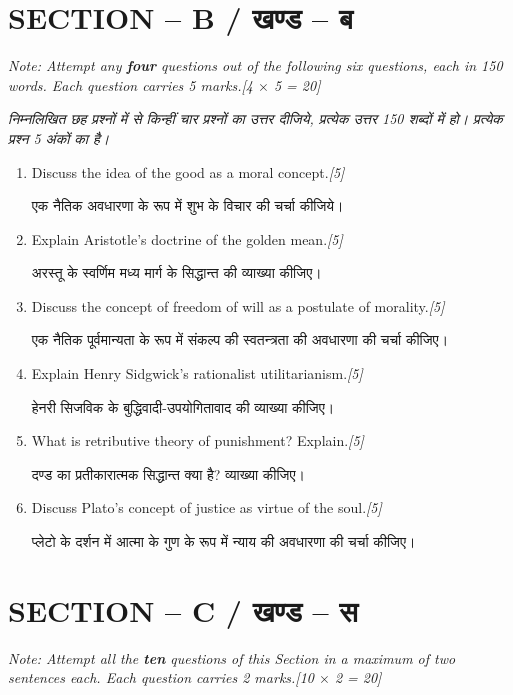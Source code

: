 \documentclass[11pt,a4paper]{article}
\newcommand{\pts}[1]{\hfill \textit{[#1]}}
\begin{document}
\bigskip

\section*{SECTION -- B / खण्ड -- ब}
\noindent \textit{Note: Attempt any \textbf{four} questions out of the following six questions, each in 150 words. Each question carries 5 marks.}\pts{4 $\times$ 5 = 20}

\noindent \textit{निम्नलिखित छह प्रश्नों में से किन्हीं चार प्रश्नों का उत्तर दीजिये, प्रत्येक उत्तर 150 शब्दों में हो। प्रत्येक प्रश्न 5 अंकों का है।}

\begin{enumerate}[label=\textbf{\arabic*.},leftmargin=*,start=6,itemsep=10pt]

  \item Discuss the idea of the good as a moral concept.\pts{5}
  
  एक नैतिक अवधारणा के रूप में शुभ के विचार की चर्चा कीजिये।

  \item Explain Aristotle's doctrine of the golden mean.\pts{5}
  
  अरस्तू के स्वर्णिम मध्य मार्ग के सिद्धान्त की व्याख्या कीजिए।

  \item Discuss the concept of freedom of will as a postulate of morality.\pts{5}
  
  एक नैतिक पूर्वमान्यता के रूप में संकल्प की स्वतन्त्रता की अवधारणा की चर्चा कीजिए।

  \item Explain Henry Sidgwick's rationalist utilitarianism.\pts{5}
  
  हेनरी सिजविक के बुद्धिवादी-उपयोगितावाद की व्याख्या कीजिए।

  \item What is retributive theory of punishment? Explain.\pts{5}
  
  दण्ड का प्रतीकारात्मक सिद्धान्त क्या है? व्याख्या कीजिए।

  \item Discuss Plato's concept of justice as virtue of the soul.\pts{5}
  
  प्लेटो के दर्शन में आत्मा के गुण के रूप में न्याय की अवधारणा की चर्चा कीजिए।

\end{enumerate}

\bigskip

\section*{SECTION -- C / खण्ड -- स}
\noindent \textit{Note: Attempt all the \textbf{ten} questions of this Section in a maximum of two sentences each. Each question carries 2 marks.}\pts{10 $\times$ 2 = 20}
\end{document}
